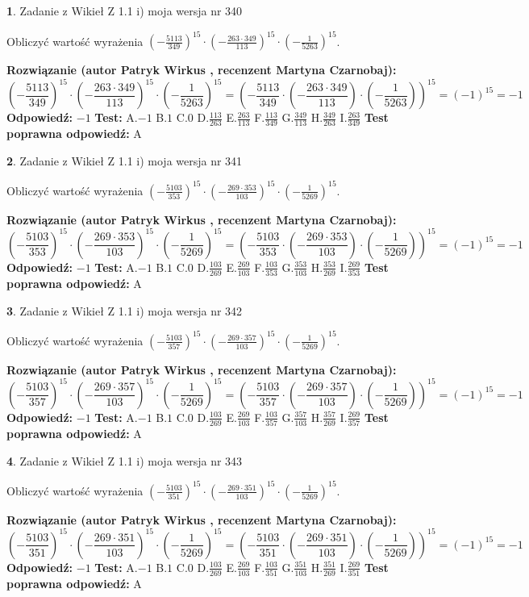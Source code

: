 \documentclass[12pt, a4paper]{article}
\theoremstyle{definition} %
\newtheorem{zad}{}
\newcommand{\zadStart}[1]{\begin{zad}#1\newline}
\newcommand{\zadStop}{\end{zad}}
\newcommand{\rozwStart}[2]{\noindent \textbf{Rozwiązanie (autor #1 , recenzent #2): }\newline}
\newcommand{\rozwStop}{\newline}
\newcommand{\odpStart}{\noindent \textbf{Odpowiedź:}\newline}
\newcommand{\odpStop}{\newline}
\newcommand{\testStart}{\noindent \textbf{Test:}\newline}
\newcommand{\testStop}{\newline}
\newcommand{\kluczStart}{\noindent \textbf{Test poprawna odpowiedź:}\newline}
\newcommand{\kluczStop}{\newline}
\begin{document}
\zadStart{Zadanie z Wikieł Z 1.1 i) moja wersja nr 340}

Obliczyć wartość wyrażenia $(-\frac{5113}{349})^{15} \cdot (-\frac{263 \cdot 349}{113})^{15} \cdot (-\frac{1}{5263})^{15}$.
\zadStop
\rozwStart{Patryk Wirkus}{Martyna Czarnobaj}
$$(-\frac{5113}{349})^{15} \cdot (-\frac{263 \cdot 349}{113})^{15} \cdot (-\frac{1}{5263})^{15} = (-\frac{5113}{349} \cdot (-\frac{263 \cdot 349}{113}) \cdot (-\frac{1}{5263}))^{15} = (-1)^{15} = -1$$
\rozwStop
\odpStart
$-1$
\odpStop
\testStart
A.$-1$ B.$1$ C.$0$ D.$\frac{113}{263}$ E.$\frac{263}{113}$
F.$\frac{113}{349}$ G.$\frac{349}{113}$
H.$\frac{349}{263}$
I.$\frac{263}{349}$
\testStop
\kluczStart
A
\kluczStop



\zadStart{Zadanie z Wikieł Z 1.1 i) moja wersja nr 341}

Obliczyć wartość wyrażenia $(-\frac{5103}{353})^{15} \cdot (-\frac{269 \cdot 353}{103})^{15} \cdot (-\frac{1}{5269})^{15}$.
\zadStop
\rozwStart{Patryk Wirkus}{Martyna Czarnobaj}
$$(-\frac{5103}{353})^{15} \cdot (-\frac{269 \cdot 353}{103})^{15} \cdot (-\frac{1}{5269})^{15} = (-\frac{5103}{353} \cdot (-\frac{269 \cdot 353}{103}) \cdot (-\frac{1}{5269}))^{15} = (-1)^{15} = -1$$
\rozwStop
\odpStart
$-1$
\odpStop
\testStart
A.$-1$ B.$1$ C.$0$ D.$\frac{103}{269}$ E.$\frac{269}{103}$
F.$\frac{103}{353}$ G.$\frac{353}{103}$
H.$\frac{353}{269}$
I.$\frac{269}{353}$
\testStop
\kluczStart
A
\kluczStop



\zadStart{Zadanie z Wikieł Z 1.1 i) moja wersja nr 342}

Obliczyć wartość wyrażenia $(-\frac{5103}{357})^{15} \cdot (-\frac{269 \cdot 357}{103})^{15} \cdot (-\frac{1}{5269})^{15}$.
\zadStop
\rozwStart{Patryk Wirkus}{Martyna Czarnobaj}
$$(-\frac{5103}{357})^{15} \cdot (-\frac{269 \cdot 357}{103})^{15} \cdot (-\frac{1}{5269})^{15} = (-\frac{5103}{357} \cdot (-\frac{269 \cdot 357}{103}) \cdot (-\frac{1}{5269}))^{15} = (-1)^{15} = -1$$
\rozwStop
\odpStart
$-1$
\odpStop
\testStart
A.$-1$ B.$1$ C.$0$ D.$\frac{103}{269}$ E.$\frac{269}{103}$
F.$\frac{103}{357}$ G.$\frac{357}{103}$
H.$\frac{357}{269}$
I.$\frac{269}{357}$
\testStop
\kluczStart
A
\kluczStop



\zadStart{Zadanie z Wikieł Z 1.1 i) moja wersja nr 343}

Obliczyć wartość wyrażenia $(-\frac{5103}{351})^{15} \cdot (-\frac{269 \cdot 351}{103})^{15} \cdot (-\frac{1}{5269})^{15}$.
\zadStop
\rozwStart{Patryk Wirkus}{Martyna Czarnobaj}
$$(-\frac{5103}{351})^{15} \cdot (-\frac{269 \cdot 351}{103})^{15} \cdot (-\frac{1}{5269})^{15} = (-\frac{5103}{351} \cdot (-\frac{269 \cdot 351}{103}) \cdot (-\frac{1}{5269}))^{15} = (-1)^{15} = -1$$
\rozwStop
\odpStart
$-1$
\odpStop
\testStart
A.$-1$ B.$1$ C.$0$ D.$\frac{103}{269}$ E.$\frac{269}{103}$
F.$\frac{103}{351}$ G.$\frac{351}{103}$
H.$\frac{351}{269}$
I.$\frac{269}{351}$
\testStop
\kluczStart
A
\kluczStop
\end{document}
